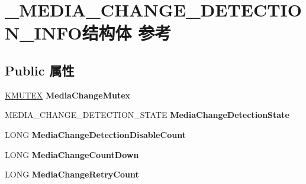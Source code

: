 \hypertarget{struct___m_e_d_i_a___c_h_a_n_g_e___d_e_t_e_c_t_i_o_n___i_n_f_o}{}\section{\+\_\+\+M\+E\+D\+I\+A\+\_\+\+C\+H\+A\+N\+G\+E\+\_\+\+D\+E\+T\+E\+C\+T\+I\+O\+N\+\_\+\+I\+N\+F\+O结构体 参考}
\label{struct___m_e_d_i_a___c_h_a_n_g_e___d_e_t_e_c_t_i_o_n___i_n_f_o}
\subsection*{Public 属性}
\begin{DoxyCompactItemize}
\item 
\mbox{\label{struct___m_e_d_i_a___c_h_a_n_g_e___d_e_t_e_c_t_i_o_n___i_n_f_o_aa6406e6377d6ff71ff47394266b38ff4}} 
\hyperlink{struct___k_m_u_t_a_n_t}{K\+M\+U\+T\+EX} {\bfseries Media\+Change\+Mutex}
\item 
\mbox{\label{struct___m_e_d_i_a___c_h_a_n_g_e___d_e_t_e_c_t_i_o_n___i_n_f_o_ace69d8323e5c89312942ca21b01c2fa4}} 
M\+E\+D\+I\+A\+\_\+\+C\+H\+A\+N\+G\+E\+\_\+\+D\+E\+T\+E\+C\+T\+I\+O\+N\+\_\+\+S\+T\+A\+TE {\bfseries Media\+Change\+Detection\+State}
\item 
\mbox{\label{struct___m_e_d_i_a___c_h_a_n_g_e___d_e_t_e_c_t_i_o_n___i_n_f_o_adc43eaf5213e54dcce459adb8e3f1828}} 
L\+O\+NG {\bfseries Media\+Change\+Detection\+Disable\+Count}
\item 
\mbox{\label{struct___m_e_d_i_a___c_h_a_n_g_e___d_e_t_e_c_t_i_o_n___i_n_f_o_ab2c33c770c277f360990af3eb972df26}} 
L\+O\+NG {\bfseries Media\+Change\+Count\+Down}
\item 
\mbox{\label{struct___m_e_d_i_a___c_h_a_n_g_e___d_e_t_e_c_t_i_o_n___i_n_f_o_a3efe98fb2ced2985458f261c766141f2}} 
L\+O\+NG {\bfseries Media\+Change\+Retry\+Count}

\end{DoxyCompactItemize}
